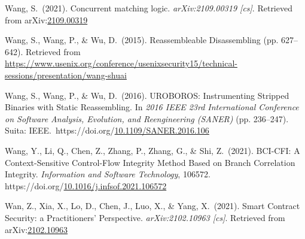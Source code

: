 \documentclass[12pt,twoside]{article}
\begin{document}
{\begin{thebibliography}{1079}
\mdbibitemlabel{}Wang, S.~(2021). Concurrent matching logic. \emph{arXiv:2109.00319 {}[cs]}. Retrieved from arXiv:\href{http://arxiv.org/abs/2109.00319}{2109.00319}%

\mdbibitemlabel{}Wang, S., Wang, P., \& Wu, D.~(2015). Reassembleable Disassembling (pp. 627–642). Retrieved from \href{https://www.usenix.org/conference/usenixsecurity15/technical-sessions/presentation/wang-shuai}{{\ttfamily https://\hspace{0pt}www.\hspace{0pt}usenix.\hspace{0pt}org/\hspace{0pt}conference/\hspace{0pt}usenixsecurity15/\hspace{0pt}technical-\hspace{0pt}sessions/\hspace{0pt}presentation/\hspace{0pt}wang-\hspace{0pt}shuai}}%

\mdbibitemlabel{}Wang, S., Wang, P., \& Wu, D.~(2016). UROBOROS: Instrumenting Stripped Binaries with Static Reassembling. In \emph{2016 IEEE 23rd International Conference on Software Analysis, Evolution, and Reengineering (SANER)} (pp. 236–247). Suita: IEEE.~https://doi.org/\href{https://dx.doi.org/10.1109/SANER.2016.106}{10.1109/SANER.2016.106}%

\mdbibitemlabel{}Wang, Y., Li, Q., Chen, Z., Zhang, P., Zhang, G., \& Shi, Z.~(2021). BCI-CFI: A Context-Sensitive Control-Flow Integrity Method Based on Branch Correlation Integrity. \emph{Information and Software Technology}, 106572. https://doi.org/\href{https://dx.doi.org/10.1016/j.infsof.2021.106572}{10.1016/j.infsof.2021.106572}%

\mdbibitemlabel{}Wan, Z., Xia, X., Lo, D., Chen, J., Luo, X., \& Yang, X.~(2021). Smart Contract Security: a Practitioners’ Perspective. \emph{arXiv:2102.10963 {}[cs]}. Retrieved from arXiv:\href{http://arxiv.org/abs/2102.10963}{2102.10963}%


\end{thebibliography}}
\end{document}
